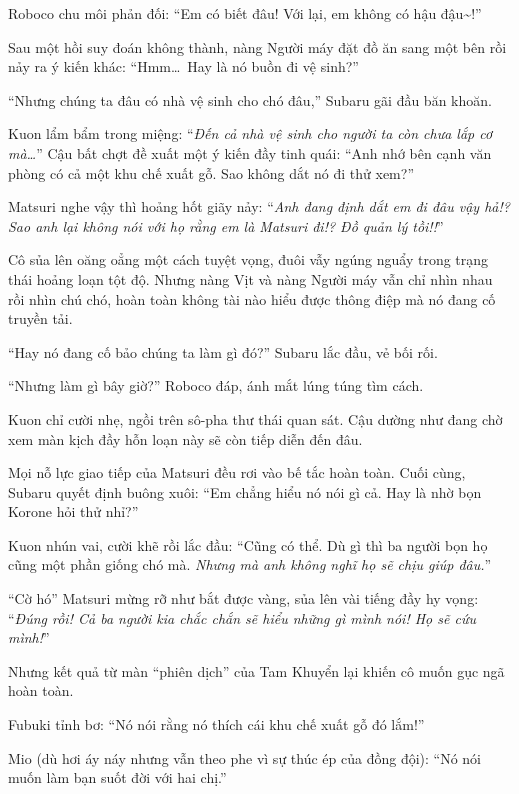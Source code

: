 \documentclass[../main.tex]{subfiles}
\begin{document}
Roboco chu môi phản đối: ``Em có biết đâu! Với lại, em không có hậu đậu\~{}!''

Sau một hồi suy đoán không thành, nàng Người máy đặt đồ ăn sang một bên rồi nảy ra ý kiến khác: ``Hmm\dots\ Hay là nó buồn đi vệ sinh?''

``Nhưng chúng ta đâu có nhà vệ sinh cho chó đâu,'' Subaru gãi đầu băn khoăn.

Kuon lẩm bẩm trong miệng: ``\textit{Đến cả nhà vệ sinh cho người ta còn chưa lắp cơ mà\dots}'' Cậu bất chợt đề xuất một ý kiến đầy tinh quái: ``Anh nhớ bên cạnh văn phòng có cả một khu chế xuất gỗ. Sao không dắt nó đi thử xem?''

Matsuri nghe vậy thì hoảng hốt giãy nảy: ``\textit{Anh đang định dắt em đi đâu vậy hả!? Sao anh lại không nói với họ rằng em là Matsuri đi!? Đồ quản lý tồi!!}''


Cô sủa lên oăng oẳng một cách tuyệt vọng, đuôi vẫy ngúng nguẩy trong trạng thái hoảng loạn tột độ. Nhưng nàng Vịt và nàng Người máy vẫn chỉ nhìn nhau rồi nhìn chú chó, hoàn toàn không tài nào hiểu được thông điệp mà nó đang cố truyền tải.

``Hay nó đang cố bảo chúng ta làm gì đó?'' Subaru lắc đầu, vẻ bối rối.

``Nhưng làm gì bây giờ?'' Roboco đáp, ánh mắt lúng túng tìm cách.

Kuon chỉ cười nhẹ, ngồi trên sô-pha thư thái quan sát. Cậu dường như đang chờ xem màn kịch đầy hỗn loạn này sẽ còn tiếp diễn đến đâu.

\ct

Mọi nỗ lực giao tiếp của Matsuri đều rơi vào bế tắc hoàn toàn. Cuối cùng, Subaru quyết định buông xuôi: ``Em chẳng hiểu nó nói gì cả. Hay là nhờ bọn Korone hỏi thử nhỉ?''

Kuon nhún vai, cười khẽ rồi lắc đầu: ``Cũng có thể. Dù gì thì ba người bọn họ cũng một phần giống chó mà. \textit{Nhưng mà anh không nghĩ họ sẽ chịu giúp đâu.}''

``Cờ hó'' Matsuri mừng rỡ như bắt được vàng, sủa lên vài tiếng đầy hy vọng: ``\textit{Đúng rồi! Cả ba người kia chắc chắn sẽ hiểu những gì mình nói! Họ sẽ cứu mình!}''

Nhưng kết quả từ màn ``phiên dịch'' của Tam Khuyển lại khiến cô muốn gục ngã hoàn toàn.

Fubuki tỉnh bơ: ``Nó nói rằng nó thích cái khu chế xuất gỗ đó lắm!''

Mio (dù hơi áy náy nhưng vẫn theo phe vì sự thúc ép của đồng đội): ``Nó nói muốn làm bạn suốt đời với hai chị.''
\end{document}
